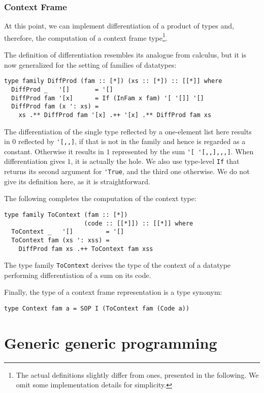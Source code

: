 \documentclass[runningheads]{llncs}
\newcommand{\K}[1]{\lstinline[style=fancy]{#1}}
\begin{document}
\subsubsection{Context Frame}

At this point, we can implement differentiation of a product of types and, therefore, the computation of a context frame type\footnote{The actual definitions slightly differ from ones, presented in the following. We omit some implementation details for simplicity.}. 

The definition of differentiation resembles its analogue from calculus, but it is now generalized for the setting of families of datatypes:
\begin{lstlisting}[style=fancy]
type family DiffProd (fam :: [*]) (xs :: [*]) :: [[*]] where
  DiffProd _   '[]       = '[]
  DiffProd fam '[x]      = If (InFam x fam) '[ '[]] '[]
  DiffProd fam (x ': xs) =
    xs .** DiffProd fam '[x] .++ '[x] .** DiffProd fam xs
\end{lstlisting}
The differentiation of the single type reflected by a one-element list here results in $0$ reflected by \K{'[,,]}, if that is not in the family and hence is regarded as a constant. Otherwise it results in $1$ represented by the sum \K{'[ '[,,],,,]}. When differentiation gives $1$, it is actually the hole. We also use type-level \K{If} that returns its second argument for \K{'True}, and the third one otherwise. We do not give its definition here, as it is straightforward.

The following completes the computation of the context type:
\begin{lstlisting}[style=fancy]
type family ToContext (fam :: [*])
                      (code :: [[*]]) :: [[*]] where
  ToContext _   '[]         = '[]
  ToContext fam (xs ': xss) =
    DiffProd fam xs .++ ToContext fam xss
\end{lstlisting}
The type family \K{ToContext} derives the type of the context of a datatype performing differentiation of a sum on its code.

Finally, the type of a context frame representation is a type synonym:
\begin{lstlisting}[style=fancy]
type Context fam a = SOP I (ToContext fam (Code a))
\end{lstlisting}


\section{Generic generic programming}
\label{sec:ggp}
\end{document}
